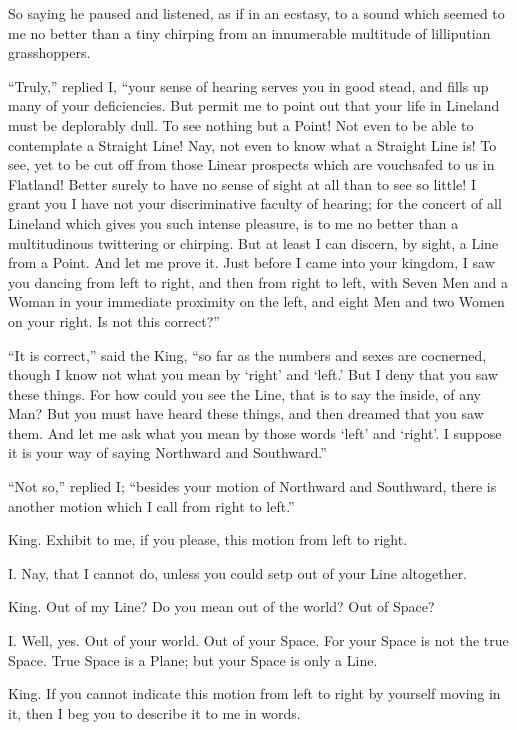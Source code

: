 \documentclass[12pt, a4paper, oneside]{memoir}
\begin{document}
So saying he paused and listened, as if in an ecstasy, to a sound which seemed
to me no better than a tiny chirping from an innumerable multitude of
lilliputian grasshoppers.

``Truly,'' replied I, ``your sense of hearing serves you in good stead, and fills
up many of your deficiencies. But permit me to point out that your life in
Lineland must be deplorably dull. To see nothing but a Point! Not even to be
able to contemplate a Straight Line! Nay, not even to know what a Straight
Line is! To see, yet to be cut off from those Linear prospects which are
vouchsafed to us in Flatland! Better surely to have no sense of sight at all
than to see so little! I grant you I have not your discriminative faculty of
hearing; for the concert of all Lineland which gives you such intense
pleasure, is to me no better than a multitudinous twittering or chirping. But
at least I can discern, by sight, a Line from a Point. And let me prove it.
Just before I came into your kingdom, I saw you dancing from left to right,
and then from right to left, with Seven Men and a Woman in your immediate
proximity on the left, and eight Men and two Women on your right. Is not this
correct?''

``It is correct,'' said the King, ``so far as the numbers and sexes are
cocnerned, though I know not what you mean by `right' and `left.' But I deny
that you saw these things. For how could you see the Line, that is to say the
inside, of any Man? But you must have heard these things, and then dreamed
that you saw them. And let me ask what you mean by those words `left' and
`right'. I suppose it is your way of saying Northward and Southward.''

``Not so,'' replied I; ``besides your motion of Northward and Southward, there is
another motion which I call from right to left.''

King. Exhibit to me, if you please, this motion from left to right.

I. Nay, that I cannot do, unless you could setp out of your Line altogether.

King. Out of my Line? Do you mean out of the world? Out of Space?

I. Well, yes. Out of your world. Out of your Space. For your Space is not the
true Space. True Space is a Plane; but your Space is only a Line.

King. If you cannot indicate this motion from left to right by yourself moving
in it, then I beg you to describe it to me in words.
\end{document}
